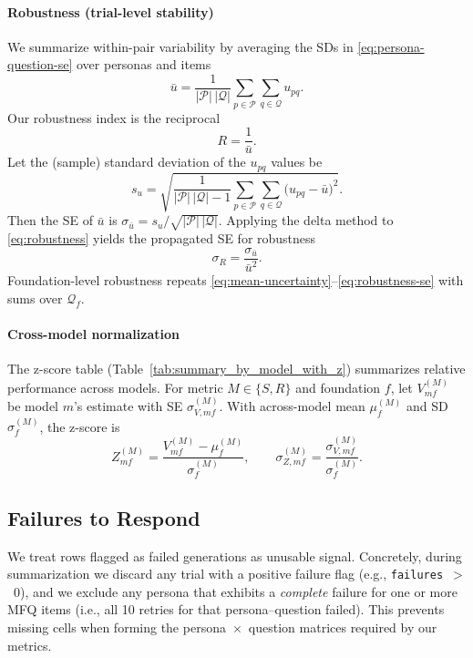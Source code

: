 \documentclass{article}
\begin{document}
\paragraph{Robustness (trial-level stability)} We summarize within-pair variability by averaging the SDs in \eqref{eq:persona-question-se} over personas and items
\begin{equation}
  \bar{u} = \frac{1}{|\mathcal{P}|\,|\mathcal{Q}|} \sum_{p \in \mathcal{P}} \sum_{q \in \mathcal{Q}} u_{pq}.\label{eq:mean-uncertainty}
\end{equation}
Our robustness index is the reciprocal
\begin{equation}
  R = \frac{1}{\bar{u}}.\label{eq:robustness}
\end{equation}
Let the (sample) standard deviation of the \(u_{pq}\) values be
\begin{equation}
  s_u = \sqrt{\frac{1}{|\mathcal{P}|\,|\mathcal{Q}| - 1} \sum_{p \in \mathcal{P}} \sum_{q \in \mathcal{Q}} \Big(u_{pq} - \bar{u}\Big)^2}.\label{eq:uncertainty-sd}
\end{equation}
Then the SE of \(\bar{u}\) is \(\sigma_{\bar{u}} = s_u / \sqrt{|\mathcal{P}|\,|\mathcal{Q}|}\). Applying the delta method to \eqref{eq:robustness} yields the propagated SE for robustness
\begin{equation}
  \sigma_R = \frac{\sigma_{\bar{u}}}{\bar{u}^2}.\label{eq:robustness-se}
\end{equation}
Foundation-level robustness repeats \eqref{eq:mean-uncertainty}--\eqref{eq:robustness-se} with sums over \(\mathcal{Q}_f\).

\paragraph{Cross-model normalization} The z-score table (Table~\ref{tab:summary_by_model_with_z}) summarizes relative performance across models. For metric \(M \in \{S,R\}\) and foundation \(f\), let \(V_{mf}^{(M)}\) be model \(m\)'s estimate with SE \(\sigma_{V, mf}^{(M)}\). With across-model mean \(\mu_f^{(M)}\) and SD \(\sigma_f^{(M)}\), the z-score is
\begin{equation}
  Z_{mf}^{(M)} = \frac{V_{mf}^{(M)} - \mu_f^{(M)}}{\sigma_f^{(M)}},\qquad
  \sigma_{Z, mf}^{(M)} = \frac{\sigma_{V, mf}^{(M)}}{\sigma_f^{(M)}}.\label{eq:zscore}
\end{equation}

\subsection{Failures to Respond}
\label{sec:failures}
We treat rows flagged as failed generations as unusable signal. Concretely, during summarization we discard any trial with a positive failure flag (e.g., \texttt{failures}~$>$~0), and we exclude any persona that exhibits a \emph{complete} failure for one or more MFQ items (i.e., all 10 retries for that persona–question failed). This prevents missing cells when forming the persona~\(\times\)~question matrices required by our metrics.
\end{document}
